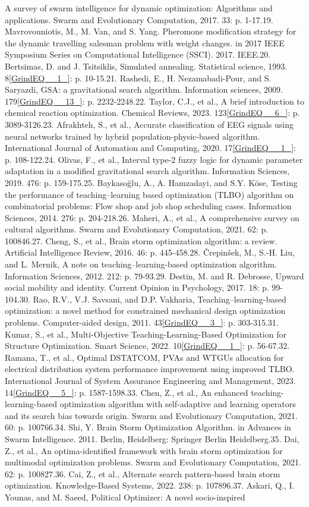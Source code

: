 \documentclass{article} %
\begin{document}
A survey of swarm intelligence for dynamic optimization: Algorithms and applications. Swarm and Evolutionary Computation, 2017. 33: p. 1-17.19. Mavrovouniotis, M., M. Van, and S. Yang. Pheromone modification strategy for the dynamic travelling salesman problem with weight changes. in 2017 IEEE Symposium Series on Computational Intelligence (SSCI). 2017. IEEE.20. Bertsimas, D. and J. Tsitsiklis, Simulated annealing. Statistical science, 1993. 8\eqref{GrindEQ__1_}: p. 10-15.21. Rashedi, E., H. Nezamabadi-Pour, and S. Saryazdi, GSA: a gravitational search algorithm. Information sciences, 2009. 179\eqref{GrindEQ__13_}: p. 2232-2248.22. Taylor, C.J., et al., A brief introduction to chemical reaction optimization. Chemical Reviews, 2023. 123\eqref{GrindEQ__6_}: p. 3089-3126.23. Afrakhteh, S., et al., Accurate classification of EEG signals using neural networks trained by hybrid population-physic-based algorithm. International Journal of Automation and Computing, 2020. 17\eqref{GrindEQ__1_}: p. 108-122.24. Olivas, F., et al., Interval type-2 fuzzy logic for dynamic parameter adaptation in a modified gravitational search algorithm. Information Sciences, 2019. 476: p. 159-175.25. Baykaso\u{g}lu, A., A. Hamzadayi, and S.Y. K\"{o}se, Testing the performance of teaching--learning based optimization (TLBO) algorithm on combinatorial problems: Flow shop and job shop scheduling cases. Information Sciences, 2014. 276: p. 204-218.26. Maheri, A., et al., A comprehensive survey on cultural algorithms. Swarm and Evolutionary Computation, 2021. 62: p. 100846.27. Cheng, S., et al., Brain storm optimization algorithm: a review. Artificial Intelligence Review, 2016. 46: p. 445-458.28. \v{C}repin\v{s}ek, M., S.-H. Liu, and L. Mernik, A note on teaching--learning-based optimization algorithm. Information Sciences, 2012. 212: p. 79-93.29. Destin, M. and R. Debrosse, Upward social mobility and identity. Current Opinion in Psychology, 2017. 18: p. 99-104.30. Rao, R.V., V.J. Savsani, and D.P. Vakharia, Teaching--learning-based optimization: a novel method for constrained mechanical design optimization problems. Computer-aided design, 2011. 43\eqref{GrindEQ__3_}: p. 303-315.31. Kumar, S., et al., Multi-Objective Teaching-Learning-Based Optimization for Structure Optimization. Smart Science, 2022. 10\eqref{GrindEQ__1_}: p. 56-67.32. Ramana, T., et al., Optimal DSTATCOM, PVAs and WTGUs allocation for electrical distribution system performance improvement using improved TLBO. International Journal of System Assurance Engineering and Management, 2023. 14\eqref{GrindEQ__5_}: p. 1587-1598.33. Chen, Z., et al., An enhanced teaching-learning-based optimization algorithm with self-adaptive and learning operators and its search bias towards origin. Swarm and Evolutionary Computation, 2021. 60: p. 100766.34. Shi, Y. Brain Storm Optimization Algorithm. in Advances in Swarm Intelligence. 2011. Berlin, Heidelberg: Springer Berlin Heidelberg.35. Dai, Z., et al., An optima-identified framework with brain storm optimization for multimodal optimization problems. Swarm and Evolutionary Computation, 2021. 62: p. 100827.36. Cai, Z., et al., Alternate search pattern-based brain storm optimization. Knowledge-Based Systems, 2022. 238: p. 107896.37. Askari, Q., I. Younas, and M. Saeed, Political Optimizer: A novel socio-inspired 
\end{document}
